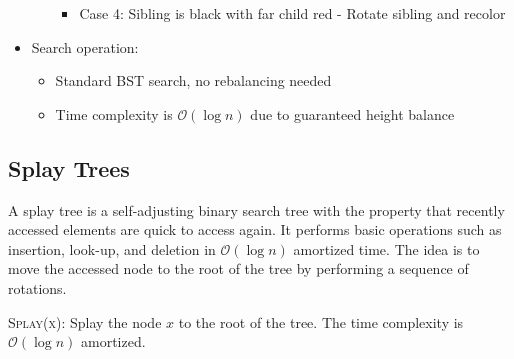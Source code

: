 \begin{itemize}
\begin{itemize}
\begin{itemize}
                    \item Case 4: Sibling is black with far child red - Rotate sibling and recolor
                \end{itemize}
        \end{itemize}
    \item Search operation:
        \begin{itemize}
            \item Standard BST search, no rebalancing needed
            \item Time complexity is \( \mathcal{O} \left( \log n \right) \) due to guaranteed height balance
        \end{itemize}
    \end{itemize}

\subsection{Splay Trees}

A splay tree is a self-adjusting binary search tree with the property that recently accessed elements are quick to access again. It performs basic operations such as insertion, look-up, and deletion in \( \mathcal{O}(\log n) \) amortized time. The idea is to move the accessed node to the root of the tree by performing a sequence of rotations.

\begin{algorithm}
    \caption{\textsc{Splay(x)}: Splay the node \( x \) to the root of the tree. The time complexity is \( \mathcal{O}(\log n) \) amortized.}
    \begin{algorithmic}
            \Else{}
            \EndIf{}
        \EndWhile{}
    \end{algorithmic}
\end{algorithm}

